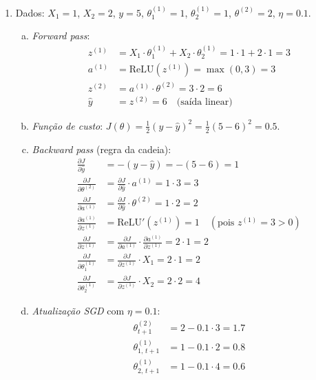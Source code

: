 \documentclass{dlproblemset}
\begin{document}
\begin{enumerate}[1)]
    \item Dados: $X_1 = 1$, $X_2 = 2$, $y = 5$, $\theta^{(1)}_1 = 1$, $\theta^{(1)}_2 = 1$, $\theta^{(2)} = 2$, $\eta = 0.1$.
    \begin{enumerate}[a)]
        \item \textit{Forward pass}:
        \begin{align*}
            z^{(1)} &= X_1 \cdot \theta^{(1)}_1 + X_2 \cdot \theta^{(1)}_2 = 1 \cdot 1 + 2 \cdot 1 = 3 \\
            a^{(1)} &= \mathrm{ReLU}(z^{(1)}) = \max(0, 3) = 3 \\
            z^{(2)} &= a^{(1)} \cdot \theta^{(2)} = 3 \cdot 2 = 6 \\
            \hat{y} &= z^{(2)} = 6 \quad \text{(saída linear)}
        \end{align*}
        \item \textit{Função de custo}: $J(\theta) = \tfrac{1}{2}(y - \hat{y})^2 = \tfrac{1}{2}(5 - 6)^2 = 0.5$.
        \item \textit{Backward pass} (regra da cadeia):
        \begin{align*}
            \frac{\partial J}{\partial \hat{y}} &= -(y - \hat{y}) = -(5 - 6) = 1 \\
            \frac{\partial J}{\partial \theta^{(2)}} &= \frac{\partial J}{\partial \hat{y}} \cdot a^{(1)} = 1 \cdot 3 = 3 \\
            \frac{\partial J}{\partial a^{(1)}} &= \frac{\partial J}{\partial \hat{y}} \cdot \theta^{(2)} = 1 \cdot 2 = 2 \\
            \frac{\partial a^{(1)}}{\partial z^{(1)}} &= \mathrm{ReLU}'(z^{(1)}) = 1 \quad (\text{pois } z^{(1)} = 3 > 0) \\
            \frac{\partial J}{\partial z^{(1)}} &= \frac{\partial J}{\partial a^{(1)}} \cdot \frac{\partial a^{(1)}}{\partial z^{(1)}} = 2 \cdot 1 = 2 \\
            \frac{\partial J}{\partial \theta^{(1)}_1} &= \frac{\partial J}{\partial z^{(1)}} \cdot X_1 = 2 \cdot 1 = 2 \\
            \frac{\partial J}{\partial \theta^{(1)}_2} &= \frac{\partial J}{\partial z^{(1)}} \cdot X_2 = 2 \cdot 2 = 4
        \end{align*}
        \item \textit{Atualização SGD} com $\eta = 0.1$:
        \begin{align*}
            \theta^{(2)}_{t+1}      &= 2 - 0.1 \cdot 3 = 1.7 \\
            \theta^{(1)}_{1,\,t+1}  &= 1 - 0.1 \cdot 2 = 0.8 \\
            \theta^{(1)}_{2,\,t+1}  &= 1 - 0.1 \cdot 4 = 0.6
        \end{align*}
    \end{enumerate}


\end{enumerate}
\end{document}

